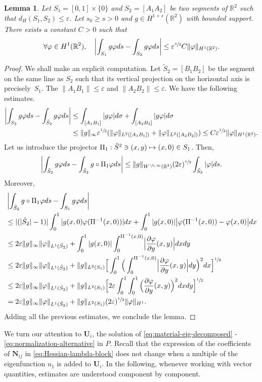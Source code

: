 \documentclass[JEP,XML,SOM,Unicode,ThmDefs,NoFloatCountersInSection,published]{cedram}
\def\mto{\mathchoice{\longmapsto}{\mapsto}{\mapsto}{\mapsto}}
\theoremstyle{plain}
\newtheorem{lemma}[thm]{Lemma}
\theoremstyle{definition}
\newcommand{\bo}[1]{{\boldsymbol#1}}
\def\R{\mathbb{R}}
\newcommand{\vps}{\varepsilon}
\newcommand{\vphi}{\varphi}
\begin{document}
\begin{lemma}
Let $S_1= [0,1]\times \{0\}$ and $S_2 = [A_1A_2]$ be two segments of $\R^2$ such that $d_H(S_1, S_2) \le \vps$.
Let $s_0\ge s >0$ and $g \in H^{1+s} (\R^2)$ with bounded support. There exists a constant $C>0$ such that
\[
\forall \vphi \in H^1(\R^2), \quad\left|\int_{S_1} g \vphi ds - \int_{S_2} g \vphi ds\right| \le \vps^{\sfrac s2} C \| \vphi \|_{H^1(\R^2)}.
\]
\end{lemma}
\begin{proof}
We shall make an explicit computation. Let $\tilde S_2= [B_1B_2]$ be the segment on the same line as $S_2$ such that its vertical projection on the horizontal axis is precisely~$S_1$. The $\|A_1B_1\| \le \vps$ and $\|A_2B_2\| \le \vps$.
We have the following estimates.
\begin{align*}
\left|\int_{S_2} g \vphi ds - \int_{\tilde S_2} g \vphi ds\right|&\le \int _{[A_1B_1]} |g \vphi |d \sigma + \int _{[A_2B_2]} |g \vphi |d \sigma
\\
&\le \|g \|_\infty \vps^{\sfrac 12}(\| \vphi \|_{L^2([A_1B_1])} + \| \vphi \|_{L^2([A_2B_2])}) \le C\vps^{\sfrac12} \| \vphi \|_{H^1(\R^2)}.
\end{align*}
Let us introduce the projector $\Pi_1: \tilde S^2 \ni (x,y) \mto (x,0)\in S_1$.
Then,
\[
\left|\int_{\tilde S_2} g \vphi ds -\int_{\tilde S_2} g\circ \Pi_1 \vphi ds\right|\le \|g\|_{W^{\sfrac s2, \infty} (\R^2)}(2\vps)^{\sfrac s2} \int _{\tilde S_2} | \vphi | ds.
\]
Moreover,
\begin{align*}&\left|\int_{\tilde S_2} g\circ \Pi_1 \vphi ds -\int_{ S_1} g \vphi ds\right|\\
&\le |(|\tilde S_2|-1)|\int_0^1 |g(x, 0) \vphi (\Pi^{-1} (x,0))| dx+ \int_0^1 |g(x, 0)| \big | \vphi (\Pi^{-1} (x,0))- \vphi (x,0) \big |dx\\
& \le 2 \vps \|g\|_\infty \| \vphi \|_{L^1(\tilde S_2)} + \int_0^1 |g(x, 0) | \int_0^{\Pi^{-1} (x,0)} \Bigl|\frac{\partial \vphi }{\partial y} (x,y)\Bigr|dxdy\\
& \le 2 \vps \|g\|_\infty \| \vphi \|_{L^1(\tilde S_2)} + \|g\|_{L^2(S_1)} \Big [\int_0^1 \Big (\int_0^{\Pi^{-1} (x,0)} \Bigl|\frac{\partial \vphi }{\partial y} (x,y)\Bigr| dy \Big)^2 dx \Big ]^{\sfrac 12}\\
&\le 2 \vps \|g\|_\infty \| \vphi \|_{L^1(\tilde S_2)} + \|g\|_{L^2(S_1)} \Big [ 2\vps \int_0^1 \int_0^1 \Big (\frac{\partial \vphi }{\partial y} (x,y)\Big)^2 dx dy\Big ]^{\sfrac 12}\\
&= 2 \vps \|g\|_\infty \| \vphi \|_{L^1(\tilde S_2)} + \|g\|_{L^2(S_1)} (2\vps)^{\sfrac 12} \| \vphi \|_{H^1}.
\end{align*}
Adding all the previous estimates, we conclude the lemma.
\end{proof}
We turn our attention to $\bo U_i$, the solution of \eqref{eq:material-eig-decomposed} - \eqref{eq:normalization-alternative} in $P$.
Recall that the expression of the coefficients of $\bo N_{ij}$ in \eqref{eq:Hessian-lambda-block} does not change when a multiple of the eigenfunction $u_1$ is added to $\bo U_i$. In the following, whenever working with vector quantities, estimates are understood component by component.
\end{document}
